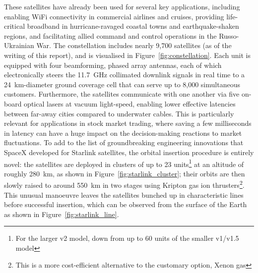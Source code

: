 \documentclass{article}
\begin{document}
These satellites have already been used for several key applications, including enabling WiFi connectivity in commercial airlines and cruises, providing life-critical broadband in hurricane-ravaged coastal towns and earthquake-shaken regions, and facilitating allied command and control operations in the Russo-Ukrainian War. The constellation includes nearly 9,700 satellites (as of the writing of this report), and is visualised in Figure~\ref{fig:constellation}. Each unit is equipped with four beamforming, phased array antennas, each of which electronically steers the \SI{11.7}{\giga\hertz} collimated downlink signals in real time to a \SI{24}{\kilo\metre}-diameter ground coverage cell that can serve up to 8,000 simultaneous customers. Furthermore, the satellites communicate with one another via five on-board optical lasers at vacuum light-speed, enabling lower effective latencies between far-away cities compared to underwater cables. This is particularly relevant for applications in stock market trading, where saving a few milliseconds in latency can have a huge impact on the decision-making reactions to market fluctuations. To add to the list of groundbreaking engineering innovations that SpaceX developed for Starlink satellites, the orbital insertion procedure is entirely novel: the satellites are deployed in clusters of up to 23 units\footnote{For the larger v2 model, down from up to 60 units of the smaller v1/v1.5 model} at an altitude of roughly \SI{280}{\kilo\metre}, as shown in Figure~\ref{fig:starlink_cluster}; their orbits are then slowly raised to around \SI{550}{\kilo\metre} in two stages using Kripton gas ion thrusters\footnote{This is a more cost-efficient alternative to the customary option, Xenon gas}. This unusual manoeuvre leaves the satellites bunched up in characteristic lines before successful insertion, which can be observed from the surface of the Earth as shown in Figure~\ref{fig:starlink_line}.
\end{document}
